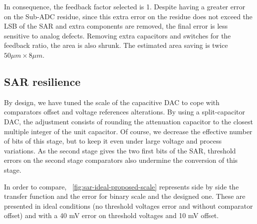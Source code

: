 In consequence, the feedback factor selected is 1. Despite having a greater error on the Sub-ADC residue, since this extra error on the residue does not exceed the LSB of the SAR and extra components are removed, the final error is less sensitive to analog defects. Removing extra capacitors and switches for the feedback ratio, the area is also shrunk. The estimated area saving is twice $50 \mu m \times 8 \mu m$.

\subsection{SAR resilience}
By design, we have tuned the scale of the capacitive DAC to cope with comparators offset and voltage references alterations. By using a split-capacitor DAC, the adjustment consists of rounding the attenuation capacitor to the closest multiple integer of the unit capacitor. Of course, we decrease the effective number of bits of this stage, but to keep it even under large voltage and process variations. As the second stage gives the two first bits of the SAR, threshold errors on the second stage comparators also undermine the conversion of this stage.

In order to compare, \figurename~\ref{fig:sar-ideal-proposed-scale} represents side by side the transfer function and the error for binary scale and the designed one. These are presented in ideal conditions (no threshold voltages error and without comparator offset) and with a 40 mV error on threshold voltages and 10 mV offset.

